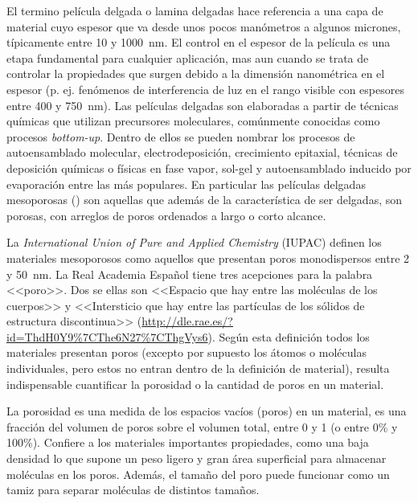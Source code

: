 	 El termino película delgada o lamina delgadas hace referencia a una capa de material cuyo espesor que va desde unos pocos manómetros a algunos micrones, típicamente entre 10 y \SI{1000}{\nm}. El control en el espesor de la película es una etapa fundamental para cualquier aplicación, mas aun cuando se trata de controlar la propiedades que surgen debido a la dimensión nanométrica en el espesor (p. ej. fenómenos de interferencia de luz en el rango visible con espesores entre 400 y \SI{750}{\nm}). 
     Las películas delgadas son elaboradas a partir de técnicas químicas que utilizan precursores moleculares, comúnmente conocidas como procesos \textit{bottom-up}. Dentro de ellos se pueden nombrar los procesos de autoensamblado molecular, electrodeposición, crecimiento epitaxial, técnicas de deposición químicas o físicas en fase vapor, sol-gel y autoensamblado inducido por evaporación entre las más populares. En particular las películas delgadas mesoporosas (\pdm) son aquellas que además de la característica de ser delgadas, son porosas, con arreglos de poros ordenados a largo o corto alcance.

	 La \textit{International Union of Pure and Applied Chemistry} (IUPAC) definen los materiales mesoporosos como aquellos que presentan poros monodispersos entre 2 y \SI{50}{\nm}. La Real Academia Español tiene tres acepciones para la palabra <<poro>>. Dos se ellas son <<Espacio que hay entre las moléculas de los cuerpos>> y <<Intersticio que hay entre las partículas de los sólidos de estructura discontinua>> (\url{http://dle.rae.es/?id=ThdH0Y9%7CThe6N27%7CThgVys6}). Según esta definición todos los materiales presentan poros (excepto por supuesto los átomos o moléculas individuales, pero estos no entran dentro de la definición de material), resulta indispensable cuantificar la porosidad\index{porosidad} o la cantidad de poros en un material. 

	 \pagebreak La porosidad es una medida de los espacios vacíos (poros) en un material, es una fracción del volumen de poros sobre el volumen total, entre 0 y 1 (o entre 0\% y 100\%).\cite{iupac-1994} Confiere a los materiales importantes propiedades, como una baja densidad lo que supone un peso ligero y gran área superficial para almacenar moléculas en los poros. Además, el tamaño del poro puede funcionar como un tamiz para separar moléculas de distintos tamaños.\cite{Martin2004} 

